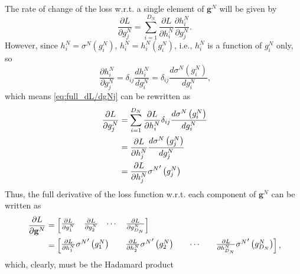 \documentclass{article}
\newcommand{\pc}[0]{\phantom{,}}
\newcommand{\pd}[0]{\phantom{.}}
\begin{document}
The rate of change of the loss w.r.t. a single element of $\mathbf{g}^N$ will be given by
\begin{equation}
\label{eq:full_dL/dgNj}
    \pd\frac{\partial L}{\partial g^N_j} = \displaystyle\sum_{i=1}^{D_N} \frac{\partial L}{\partial h^N_i}\frac{\partial h^N_i}{\partial g^N_j}.
\end{equation}
However, since $h^N_i = \sigma^N(g^N_i)$, $h^N_i = h^N_i(g^N_i)$, i.e., $h^N_i$ is a function of $g^N_i$ only, so
\begin{equation}
    \pc\frac{\partial h^N_i}{\partial g^N_j} = \delta_{ij}\frac{d h^N_i}{d g^N_i} = \delta_{ij}\frac{d \sigma^N\left(g^N_i\right)}{d g^N_i},
\end{equation}
which means \cref{eq:full_dL/dgNj} can be rewritten as
\begin{align}
    \pd\frac{\partial L}{\partial g^N_j} &= \displaystyle\sum_{i=1}^{D_N} \frac{\partial L}{\partial h^N_i}\delta_{ij}\frac{d \sigma^N\left(g^N_i\right)}{d g^N_i}\notag \\
    &= \frac{\partial L}{\partial h^N_j}\frac{d\sigma^N\left(g^N_j\right)}{d g^N_j}\notag \\
    &= \frac{\partial L}{\partial h^N_j}{\sigma^{N}}^{\prime}\left(g^N_j\right)
\end{align}
Thus, the full derivative of the loss function w.r.t. each component of $\mathbf{g}^N$ can be written as
\begin{align}
    \pc\frac{\partial L}{\partial \mathbf{g}^N} &=
    \begin{bmatrix}
        \frac{\partial L}{\partial g^N_1} & \frac{\partial L}{\partial g^N_2} & \cdots & \frac{\partial L}{\partial g^N_{D_N}}
    \end{bmatrix}\notag \\
    &=
    \begin{bmatrix}
        \frac{\partial L}{\partial h^N_1}{\sigma^{N}}^{\prime}\left(g^N_1\right)\quad & \frac{\partial L}{\partial h^N_2}{\sigma^{N}}^{\prime}\left(g^N_2\right)\quad & \cdots\quad & \frac{\partial L}{\partial h^N_{D_N}}{\sigma^{N}}^{\prime}\left(g^N_{D_N}\right)
    \end{bmatrix},
\end{align}
which, clearly, must be the Hadamard product
\end{document}
